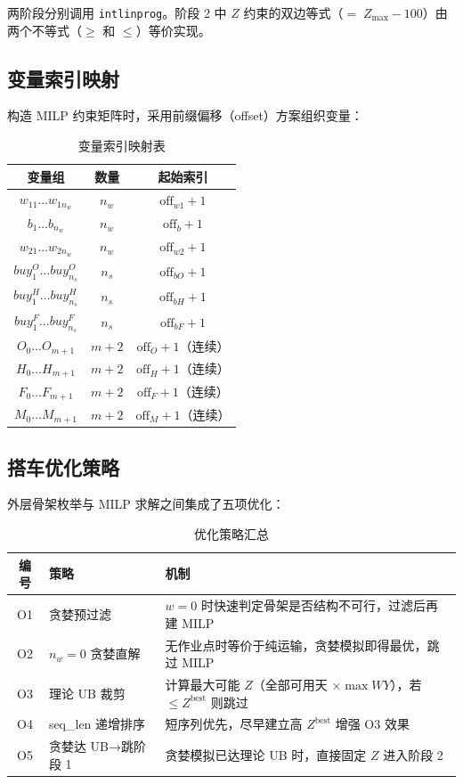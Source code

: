 \documentclass[12pt,a4paper]{ctexart}
\theoremstyle{definition}
\begin{document}
两阶段分别调用 \texttt{intlinprog}。阶段 2 中 $Z$ 约束的双边等式（$=\;Z_{\max}-100$）由两个不等式（$\ge$ 和 $\le$）等价实现。

\subsection{变量索引映射}

构造 MILP 约束矩阵时，采用前缀偏移（offset）方案组织变量：

\begin{table}[H]
  \centering
  \caption{变量索引映射表}
  \begin{tabular}{ccc}
    \toprule
    变量组 & 数量 & 起始索引 \\
    \midrule
    $w_{11}\dots w_{1n_w}$ & $n_w$   & $\text{off}_{w1}+1$ \\
    $b_1\dots b_{n_w}$     & $n_w$   & $\text{off}_b+1$ \\
    $w_{21}\dots w_{2n_w}$ & $n_w$   & $\text{off}_{w2}+1$ \\
    $buy^O_1\dots buy^O_{n_s}$ & $n_s$ & $\text{off}_{bO}+1$ \\
    $buy^H_1\dots buy^H_{n_s}$ & $n_s$ & $\text{off}_{bH}+1$ \\
    $buy^F_1\dots buy^F_{n_s}$ & $n_s$ & $\text{off}_{bF}+1$ \\
    $O_0\dots O_{m+1}$     & $m+2$  & $\text{off}_O+1$（连续） \\
    $H_0\dots H_{m+1}$     & $m+2$  & $\text{off}_H+1$（连续） \\
    $F_0\dots F_{m+1}$     & $m+2$  & $\text{off}_F+1$（连续） \\
    $M_0\dots M_{m+1}$     & $m+2$  & $\text{off}_M+1$（连续） \\
    \bottomrule
  \end{tabular}
\end{table}

\subsection{搭车优化策略}

外层骨架枚举与 MILP 求解之间集成了五项优化：

\begin{table}[H]
  \centering
  \caption{优化策略汇总}
  \begin{tabular}{cll}
    \toprule
    编号 & 策略 & 机制 \\
    \midrule
    O1 & 贪婪预过滤 & $w=0$ 时快速判定骨架是否结构不可行，过滤后再建 MILP \\
    O2 & $n_w=0$ 贪婪直解 & 无作业点时等价于纯运输，贪婪模拟即得最优，跳过 MILP \\
    O3 & 理论 UB 裁剪 & 计算最大可能 $Z$（全部可用天 $\times \max WY$），若 $\le Z^{\text{best}}$ 则跳过 \\
    O4 & seq\_len 递增排序 & 短序列优先，尽早建立高 $Z^{\text{best}}$ 增强 O3 效果 \\
    O5 & 贪婪达 UB→跳阶段 1 & 贪婪模拟已达理论 UB 时，直接固定 $Z$ 进入阶段 2 \\
    \bottomrule
  \end{tabular}
\end{table}
\end{document}
